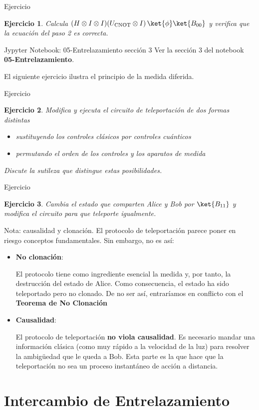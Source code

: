 \documentclass[a4paper,11pt]{book} %
\newtheorem{ejercicio_contador}{Ejercicio}
\newcommand{\Ejercicio}[1]{
		\begin{mybox_gray}{Ejercicio} 
			\begin{ejercicio_contador}
				 #1 
			\end{ejercicio_contador} 
		\end{mybox_gray}
	}
\numberwithin{equation}{chapter}
\begin{document}
	\Ejercicio{
	Calcula $(H \otimes I\otimes I)(U_{\rm CNOT}\otimes I)\, \ket{\phi}\ket{B_{00}}$ y verifica que la ecuación del paso 2 es correcta.
	}

	\begin{mybox_orange}{Jypyter Notebook: 05-Entrelazamiento sección 3}
	Ver la sección 3 del notebook \textbf{05-Entrelazamiento}.
	\end{mybox_orange}
	
El siguiente ejercicio ilustra el principio de la medida diferida.	
	
	\Ejercicio{
	Modifica y ejecuta  el circuito de teleportación de dos formas distintas
	\begin{itemize}
		\item[a)] sustituyendo los controles clásicos por controles cuánticos
		\item[b)] permutando el orden de los controles y los aparatos de medida
	\end{itemize}
	Discute la sutileza que distingue estas posibilidades. 
	}
	
	\Ejercicio{
	Cambia el estado que comparten Alice y Bob por $\ket{B_{11}}$ y modifica el circuito para que teleporte igualmente.
	}

	\begin{mybox_blue}{Nota: causalidad y clonación.}
	El protocolo de teleportación parece poner en riesgo conceptos fundamentales. Sin embargo,
	no es así:
	\begin{itemize}
		\item \textbf{No clonación}: 
		
		El protocolo tiene como ingrediente esencial la medida y, por tanto, la 
		destrucción del estado de Alice. Como consecuencia, el estado ha sido teleportado
		pero no clonado.  De no ser así, entraríamos en conflicto con el  
		\textbf{Teorema de No Clonación}
		
		\item \textbf{Causalidad}: 
		
		El protocolo de teleportación \textbf{no viola causalidad}. Es necesario mandar 
		una información clásica (como muy rápido a la velocidad de la luz) para resolver la
		ambigüedad que le queda a Bob. Esta parte es la que hace que la teleportación no sea
		un proceso instantáneo de acción a distancia.    
    
	\end{itemize}
	\end{mybox_blue}

    
    \section{Intercambio de Entrelazamiento}
\end{document}

